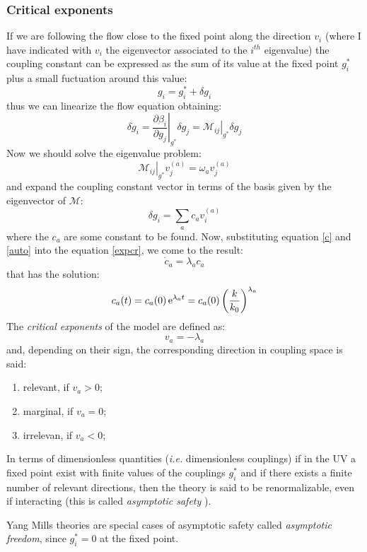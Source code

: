 \subsubsection{Critical exponents}
If we are following the flow close to the fixed point along the direction $v_i$ (where I have indicated with $v_i$
the eigenvector associated to the $i^{th}$ eigenvalue) the coupling constant can be expressed as the sum of its value
at the fixed point $g_i^*$ plus a small fuctuation around this value:
\begin{equation}
 g_i = g_i^* + \delta g_i
\end{equation}
thus we can linearize the flow equation obtaining:
\begin{equation}\label{expcr}
 \delta \dot{g}_i = \left. \frac{\partial \beta_i}{\partial g_j} \right|_{g^*}\delta g_j = \left.\mathcal{M}_{ij} \right|_{g^*}\delta g_j
\end{equation}
Now we should solve the eigenvalue problem:
\begin{equation}\label{auto}
\left.\mathcal{M}_{ij} \right|_{g^*} v_j^{(a)} = \omega_a v_j^{(a)}
\end{equation}
and expand the coupling constant vector in terms of the basis given by the eigenvector of $\mathcal{M}$:
\begin{equation}\label{c}
 \delta g_i = \sum_a c_a v_i^{(a)}
\end{equation}
where the $c_a$ are some constant to be found.
Now, substituting equation \eqref{c} and \eqref {auto} into the equation \eqref{expcr}, we come to the result:
\begin{equation}
 \dot{c}_a = \lambda_a c_a
\end{equation}
that has the solution:
\begin{equation}
 c_a(t) = c_a(0) \operatorname{e}^{\lambda_a t} = c_a(0)\left(\frac{k}{k_0}\right)^{\lambda_a}
\end{equation}
The \emph{critical exponents}  of the model are defined as:
\begin{equation}
 v_a = -\lambda_a
\end{equation}
and, depending on their sign, the corresponding direction in coupling space is said:
\begin{enumerate}
 \item relevant, if $v_a > 0$;
 \item marginal, if $v_a = 0$;
 \item irrelevan, if $v_a <0$;
\end{enumerate}
In terms of dimensionless quantities (\emph{i.e.} dimensionless couplings) if in the UV a fixed point exist with finite values
of the couplings $g_i^*$ and if there exists a finite number of relevant directions, then the theory is said to be 
renormalizable, even if interacting (this is called \emph{asymptotic safety} \cite{weinberg}).

Yang Mills theories are special cases of asymptotic safety called \emph{asymptotic freedom}, since $g_i^* = 0$ at the fixed point.

